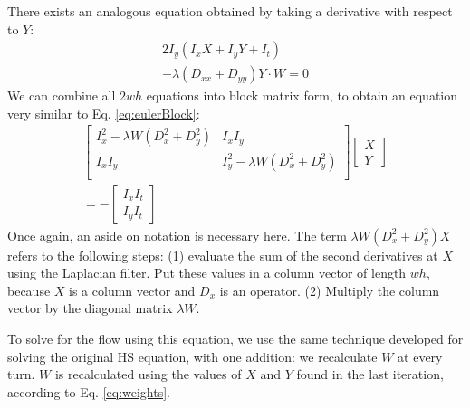 \documentclass[10pt,twocolumn,letterpaper]{article}
\begin{document}
There exists an analogous equation obtained by taking a derivative with respect to $Y$:
\begin{equation} \label{eq:leastsqy}
\begin{aligned}
2I_y (I_x X + I_y Y + I_t) \\
 -\lambda(D_{xx} + D_{yy}) Y \cdot W = 0
\end{aligned}
\end{equation} 
We can combine all $2wh$ equations into block matrix form, to obtain an equation very similar to Eq. \ref{eq:eulerBlock}:
\begin{multline} \label{eq:leastsqBlock}
\left[ \begin{array}{cc}
I_x^2 - \lambda W (D_x^2 + D_y^2) & I_x I_y\\
I_x I_y & I_y^2 - \lambda W (D_x^2 + D_y^2) \\
\end{array} \right]
\left[\begin{array}{c}
X \\
Y
\end{array} \right] \\
=-\left[ \begin{array}{c}
I_x I_t \\
I_y I_t
\end{array} \right]
\end{multline}
Once again, an aside on notation is necessary here.  The term $\lambda W (D_x^2 + D_y^2) X$ refers to the following steps: (1) evaluate the sum of the second derivatives at $X$ using the Laplacian filter.  Put these values in a column vector of length $wh$, because $X$ is a column vector and $D_x$ is an operator.  (2) Multiply the column vector by the diagonal matrix $\lambda W$.

To solve for the flow using this equation, we use the same technique developed for solving the original HS equation, with one addition: we recalculate $W$ at every turn.  $W$ is recalculated using the values of $X$ and $Y$ found in the last iteration, according to Eq. \ref{eq:weights}.
{\small


}
\end{document}
